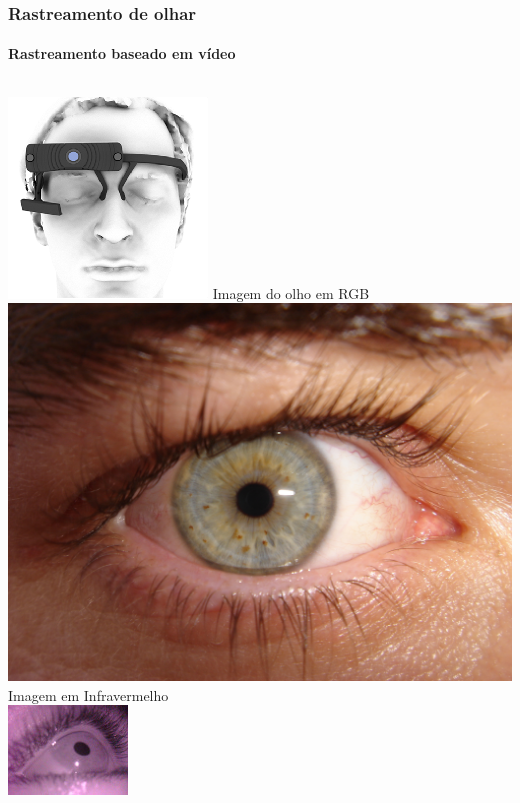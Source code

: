\documentclass[11pt]{beamer}
\begin{document}
\begin{frame}
\frametitle{Rastreamento de olhar}
\framesubtitle{Rastreamento baseado em vídeo}
\begin{columns}[t]
\centering
\hspace{10cm}
\includegraphics[scale=.6]{imagens/pupil.png}
\centering
Imagem do olho em RGB
\includegraphics[scale=.03]{imagens/Myeye.jpg} \\
\vspace{1cm}
Imagem  em Infravermelho\\
\includegraphics[scale=.1]{imagens/26.jpg}
\end{columns}
\end{frame}
\end{document}

